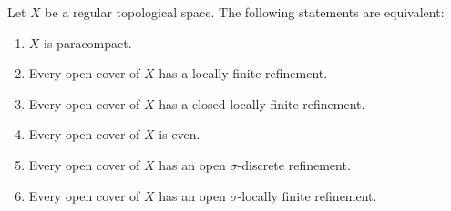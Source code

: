 Let $X$ be a regular topological space. The following statements are equivalent:
\begin{enumerate}
\item[(a)] $X$ is paracompact.
\item[(b)] Every open cover of $X$ has a locally finite refinement.
\item[(c)] Every open cover of $X$ has a closed locally finite refinement.
\item[(d)] Every open cover of $X$ is even.
\item[(e)] Every open cover of $X$ has an open $\sigma$-discrete refinement.
\item[(f)] Every open cover of $X$ has an open $\sigma$-locally finite refinement.
\end{enumerate}
